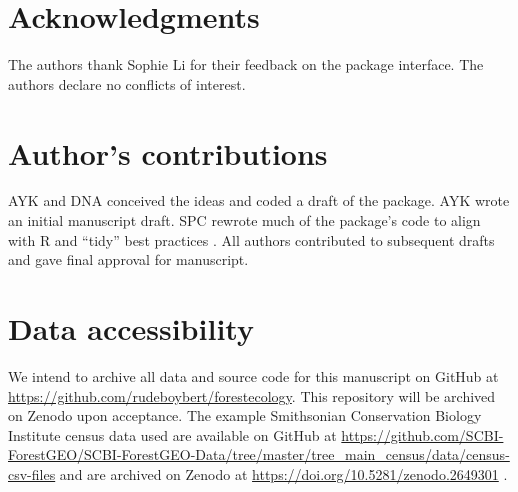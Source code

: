 \documentclass[12pt]{article}
\begin{document}
\hypertarget{acknowledgments}{%
\section{Acknowledgments}\label{acknowledgments}}

The authors thank Sophie Li for their feedback on the package interface.
The authors declare no conflicts of interest.

\hypertarget{authors-contributions}{%
\section{Author's contributions}\label{authors-contributions}}

AYK and DNA conceived the ideas and coded a draft of the package. AYK
wrote an initial manuscript draft. SPC rewrote much of the package's
code to align with R and ``tidy'' best practices
\citep{wickham_welcome_2019}. All authors contributed to subsequent
drafts and gave final approval for manuscript.

\hypertarget{data-accessibility}{%
\section{Data accessibility}\label{data-accessibility}}

We intend to archive all data and source code for this manuscript on
GitHub at \url{https://github.com/rudeboybert/forestecology}. This
repository will be archived on Zenodo upon acceptance. The example
Smithsonian Conservation Biology Institute census data used are
available on GitHub at
\url{https://github.com/SCBI-ForestGEO/SCBI-ForestGEO-Data/tree/master/tree_main_census/data/census-csv-files}
and are archived on Zenodo at
\url{https://doi.org/10.5281/zenodo.2649301}
\citep{gonzalez-akre_scbi-forestgeoscbi-forestgeo-data_2020}.



\end{document}
